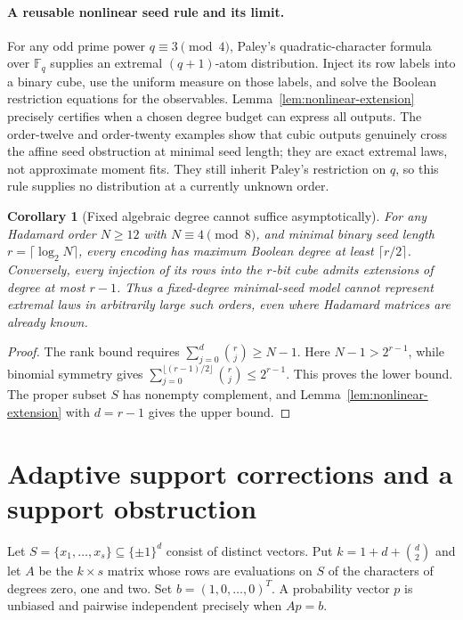 \documentclass[11pt]{article}
\newtheorem{corollary}[theorem]{Corollary}
\begin{document}
\paragraph{A reusable nonlinear seed rule and its limit.}
For any odd prime power $q\equiv3\pmod4$, Paley's quadratic-character
formula over $\mathbb F_q$ supplies an extremal $(q+1)$-atom distribution.
Inject its row labels into a binary cube, use the uniform measure on
those labels, and solve the Boolean restriction equations for the
observables. Lemma~\ref{lem:nonlinear-extension} precisely certifies when
a chosen degree budget can express all outputs. The order-twelve and
order-twenty examples show that cubic outputs genuinely cross the affine
seed obstruction at minimal seed length; they are exact extremal laws,
not approximate moment fits. They still inherit Paley's restriction on
$q$, so this rule supplies no distribution at a currently unknown order.

\begin{corollary}[Fixed algebraic degree cannot suffice asymptotically]
\label{cor:nonlinear-growing-degree}
For any Hadamard order $N\ge12$ with $N\equiv4\pmod8$, and minimal
binary seed length $r=\lceil\log_2N\rceil$, every encoding has maximum
Boolean degree at least $\lceil r/2\rceil$. Conversely, every injection
of its rows into the $r$-bit cube admits extensions of degree at most
$r-1$. Thus a fixed-degree minimal-seed model cannot represent extremal
laws in arbitrarily large such orders, even where Hadamard matrices
are already known.
\end{corollary}
\begin{proof}
The rank bound requires $\sum_{j=0}^d\binom rj\ge N-1$.
Here $N-1>2^{r-1}$, while binomial symmetry gives
$\sum_{j=0}^{\lfloor(r-1)/2\rfloor}\binom rj\le2^{r-1}$.
This proves the lower bound. The proper subset $S$ has nonempty
complement, and Lemma~\ref{lem:nonlinear-extension} with $d=r-1$
gives the upper bound.
\end{proof}

\section{Adaptive support corrections and a support obstruction}

Let $S=\{x_1,\ldots,x_s\}\subseteq\{\pm1\}^d$ consist of distinct
vectors. Put $k=1+d+\binom d2$ and let $A$ be the $k\times s$ matrix
whose rows are evaluations on $S$ of the characters of degrees zero,
one and two. Set $b=(1,0,\ldots,0)^T$. A probability vector $p$ is
unbiased and pairwise independent precisely when $Ap=b$.
\end{document}
